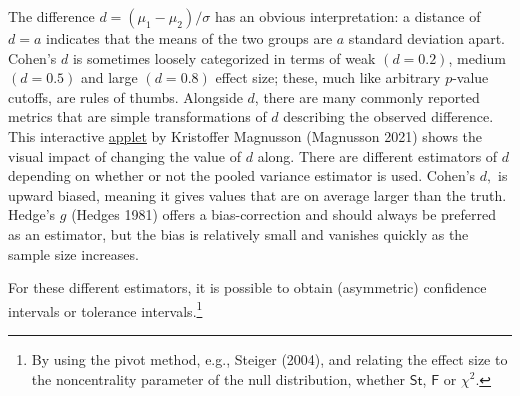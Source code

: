 \documentclass[
  11pt,
  letterpaper,
]{scrbook}
\theoremstyle{definition}
\theoremstyle{definition}
\theoremstyle{remark}
\begin{document}
The difference \(d=(\mu_1-\mu_2)/\sigma\) has an obvious interpretation:
a distance of \(d=a\) indicates that the means of the two groups are
\(a\) standard deviation apart. Cohen's \(d\) is sometimes loosely
categorized in terms of weak \((d = 0.2)\), medium \((d=0.5)\) and large
\((d=0.8)\) effect size; these, much like arbitrary \(p\)-value cutoffs,
are rules of thumbs. Alongside \(d\), there are many commonly reported
metrics that are simple transformations of \(d\) describing the observed
difference. This interactive
\href{https://rpsychologist.com/cohend/}{applet} by Kristoffer Magnusson
(Magnusson 2021) shows the visual impact of changing the value of \(d\)
along. There are different estimators of \(d\) depending on whether or
not the pooled variance estimator is used. Cohen's \(d,\) is upward
biased, meaning it gives values that are on average larger than the
truth. Hedge's \(g\) (Hedges 1981) offers a bias-correction and should
always be preferred as an estimator, but the bias is relatively small
and vanishes quickly as the sample size increases.

For these different estimators, it is possible to obtain (asymmetric)
confidence intervals or tolerance intervals.\footnote{By using the pivot
  method, e.g., Steiger (2004), and relating the effect size to the
  noncentrality parameter of the null distribution, whether
  \(\mathsf{St}\), \(\mathsf{F}\) or \(\chi^2\).}
\end{document}
